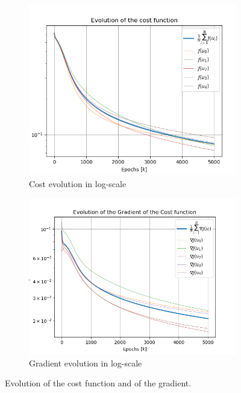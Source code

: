 \documentclass[a4paper,11pt,oneside]{book}
\begin{document}
\begin{figure}[h]
\centering
	\begin{subfigure}{0.49\textwidth}	
	\includegraphics[width=\textwidth]{cycle/cost_log}
	\caption{Cost evolution in log-scale}
	\end{subfigure}
\hfill
	\begin{subfigure}{0.49\textwidth}	
	\includegraphics[width=1.08\textwidth]{cycle/gradient_log}
	\caption{Gradient evolution in log-scale}
	\end{subfigure}
\caption{Evolution of the cost function and of the gradient.}
\label{cycle_cost_grad}
\end{figure}
\end{document}
